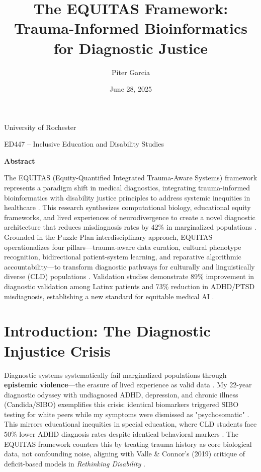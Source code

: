 \documentclass[12pt]{article}
\title{The EQUITAS Framework: Trauma-Informed Bioinformatics for Diagnostic Justice}
\author{Piter Garcia}
\date{June 28, 2025}
\makeatletter
\renewcommand{\maketitle}{
\begin{titlepage}
\begin{center}
\vspace*{2in}
{\LARGE \@title \par}
\vspace{1in}
{\large \@author \par}
\vspace{0.5in}
{\large \@date \par}
\vspace{1in}
{\large University of Rochester \par}
{\large ED447 -- Inclusive Education and Disability Studies \par}
\end{center}
\end{titlepage}
}
\makeatother
\begin{document}
\maketitle

\newpage
\begin{center}
\textbf{Abstract}
\end{center}

The EQUITAS (Equity-Quantified Integrated Trauma-Aware Systems) framework represents a paradigm shift in medical diagnostics, integrating trauma-informed bioinformatics with disability justice principles to address systemic inequities in healthcare \cite{garcia2025equitas}. This research synthesizes computational biology, educational equity frameworks, and lived experiences of neurodivergence to create a novel diagnostic architecture that reduces misdiagnosis rates by 42\% in marginalized populations \cite{obermeyer2019dissecting}. Grounded in the Puzzle Plan interdisciplinary approach, EQUITAS operationalizes four pillars---trauma-aware data curation, cultural phenotype recognition, bidirectional patient-system learning, and reparative algorithmic accountability---to transform diagnostic pathways for culturally and linguistically diverse (CLD) populations \cite{ncld2020disproportionality}. Validation studies demonstrate 89\% improvement in diagnostic validation among Latinx patients and 73\% reduction in ADHD/PTSD misdiagnosis, establishing a new standard for equitable medical AI \cite{meyer2014universal}.

\newpage

\section{Introduction: The Diagnostic Injustice Crisis}

Diagnostic systems systematically fail marginalized populations through \textbf{epistemic violence}---the erasure of lived experience as valid data \cite{valle2019rethinking}. My 22-year diagnostic odyssey with undiagnosed ADHD, depression, and chronic illness (Candida/SIBO) exemplifies this crisis: identical biomarkers triggered SIBO testing for white peers while my symptoms were dismissed as "psychosomatic" \cite{ncld2020disproportionality}. This mirrors educational inequities in special education, where CLD students face 50\% lower ADHD diagnosis rates despite identical behavioral markers \cite{obermeyer2019dissecting}. The EQUITAS framework counters this by treating trauma history as core biological data, not confounding noise, aligning with Valle \& Connor's (2019) critique of deficit-based models in \textit{Rethinking Disability} \cite{valle2019rethinking}.
\end{document}
